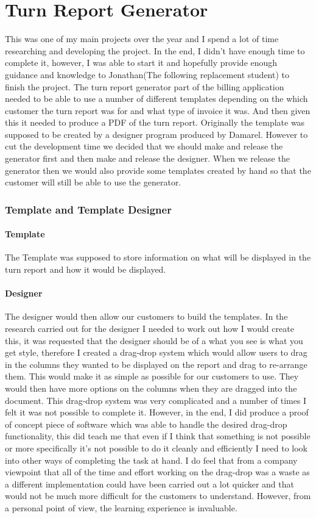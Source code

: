 \section{Turn Report Generator}{
	This was one of my main projects over the year and I spend a lot of time researching and developing the project. In the end, I didn't have enough time to complete it, however, I was able to start it and hopefully provide enough guidance and knowledge to Jonathan(The following replacement student) to finish the project. The turn report generator part of the billing application needed to be able to use a number of different templates depending on the which customer the turn report was for and what type of invoice it was. And then given this it needed to produce a PDF of the turn report. Originally the template was supposed to be created by a designer program produced by Damarel. However to cut the development time we decided that we should make and release the generator first and then make and release the designer. When we release the generator then we would also provide some templates created by hand so that the customer will still be able to use the generator.
	\subsubsection*{Template and Template Designer}{
		\paragraph{Template}{The Template was supposed to store information on what will be displayed in the turn report and how it would be displayed.}
		\paragraph{Designer}{The designer would then allow our customers to build the templates. In the research carried out for the designer I needed to work out how I would create this, it was requested that the designer should be of a what you see is what you get style, therefore I created a drag-drop system which would allow users to drag in the columns they wanted to be displayed on the report and drag to re-arrange them. This would make it as simple as possible for our customers to use. They would then have more options on the columns when they are dragged into the document. This drag-drop system was very complicated and a number of times I felt it was not possible to complete it. However, in the end, I did produce a proof of concept piece of software which was able to handle the desired drag-drop functionality, this did teach me that even if I think that something is not possible or more specifically it's not possible to do it cleanly and efficiently I need to look into other ways of completing the task at hand. I do feel that from a company viewpoint that all of the time and effort working on the drag-drop was a waste as a different implementation could have been carried out a lot quicker and that would not be much more difficult for the customers to understand. However, from a personal point of view, the learning experience is invaluable.}
}}
